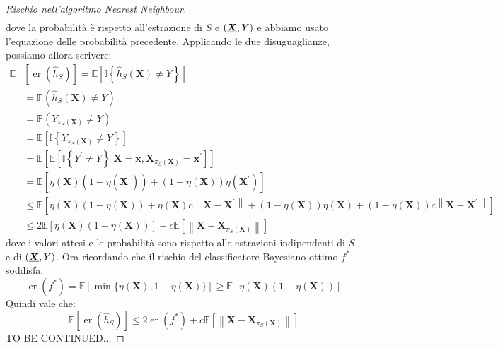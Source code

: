 \documentclass[\main/main.tex]{subfiles}
\begin{document}
\begin{proof}[Rischio nell'algoritmo Nearest Neighbour]
\begin{align*}
        \end{align*}
        dove la probabilità è rispetto all'estrazione di \(S\) e \(\rnd{\bm{X}, Y}\) e abbiamo usato l'equazione delle probabilità precedente. Applicando le due disuguaglianze, possiamo allora scrivere:
        \begin{align*} \mathbb{E} &\left[\operatorname{er}\left(\widehat{h}_{S}\right)\right]=\mathbb{E}\left[\mathbb{I}\left\{\widehat{h}_{S}(\boldsymbol{X}) \neq Y\right\}\right] \\ &=\mathbb{P}\left(\widehat{h}_{S}(\boldsymbol{X}) \neq Y\right) \\ &=\mathbb{P}\left(Y_{\pi_{S}(\boldsymbol{X})} \neq Y\right) \\ &=\mathbb{E}\left[\mathbb{I}\left\{Y_{\pi_{S}(\boldsymbol{X})} \neq Y\right\}\right]\\
        &=\mathbb{E}\left[\mathbb{E}\left[\mathbb{I}\left\{Y^{\prime} \neq Y\right\} | \boldsymbol{X}=\boldsymbol{x}, \boldsymbol{X}_{\pi_{S}(\boldsymbol{X})}=\boldsymbol{x}^{\prime}\right]\right] \\ &=\mathbb{E}\left[\eta(\boldsymbol{X})\left(1-\eta\left(\boldsymbol{X}^{\prime}\right)\right)+(1-\eta(\boldsymbol{X})) \eta\left(\boldsymbol{X}^{\prime}\right)\right]\\
        &\leq \mathbb{E}\left[\eta(\boldsymbol{X})(1-\eta(\boldsymbol{X}))+\eta(\boldsymbol{X}) c\left\|\boldsymbol{X}-\boldsymbol{X}^{\prime}\right\|+(1-\eta(\boldsymbol{X})) \eta(\boldsymbol{X})+(1-\eta(\boldsymbol{X})) c\left\|\boldsymbol{X}-\boldsymbol{X}^{\prime}\right\|\right]\\
        &\leq 2 \mathbb{E}[\eta(\boldsymbol{X})(1-\eta(\boldsymbol{X}))]+c \mathbb{E}\left[\left\|\boldsymbol{X}-\boldsymbol{X}_{\pi_{S}(\boldsymbol{X})}\right\|\right]
        \end{align*}
        dove i valori attesi e le probabilità sono rispetto alle estrazioni indipendenti di \(S\) e di \(\rnd{\bm{X}, Y}\). Ora ricordando che il rischio del classificatore Bayesiano ottimo \(f^*\) soddisfa:
        \[
            \operatorname{er}\left(f^{*}\right)=\mathbb{E}[\min \{\eta(\boldsymbol{X}), 1-\eta(\boldsymbol{X})\}] \geq \mathbb{E}[\eta(\boldsymbol{X})(1-\eta(\boldsymbol{X}))]
        \]
        Quindi vale che:
        \[
            \mathbb{E}\left[\operatorname{er}\left(\widehat{h}_{S}\right)\right] \leq 2 \operatorname{er}\left(f^{*}\right)+c \mathbb{E}\left[\left\|\boldsymbol{X}-\boldsymbol{X}_{\pi_{S}(\boldsymbol{X})}\right\|\right]
        \]
        TO BE CONTINUED...
    \end{proof}
\end{document}
